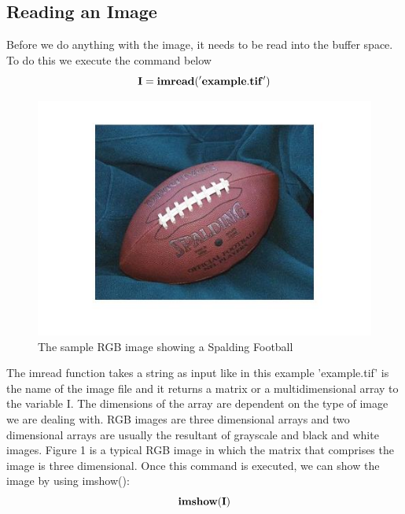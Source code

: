 \documentclass[12pt]{article}
\begin{document}
   \subsection{Reading an Image}
     Before we do anything with the image, it needs to be read into the buffer space. To do this we execute the command below
   \[{\bf I=imread('example.tif')}\]
    \begin{figure}
    \centering
    \includegraphics[scale=0.5]{football.jpg}
    \caption{The sample RGB image showing a Spalding Football}
    \end{figure}
    The imread function takes a string as input like in this example 'example.tif' is the name of the image file and it returns a matrix or a multidimensional array to the variable I. The dimensions of the array are dependent on the type of image we are dealing with. RGB images are three dimensional arrays and two dimensional arrays are usually the resultant of grayscale and black and white images. Figure 1 is a typical RGB image in which the matrix that comprises the image is three dimensional. 
   Once this command is executed, we can show the image by using imshow():
    \[ {\bf imshow(I)}\]
\end{document}
